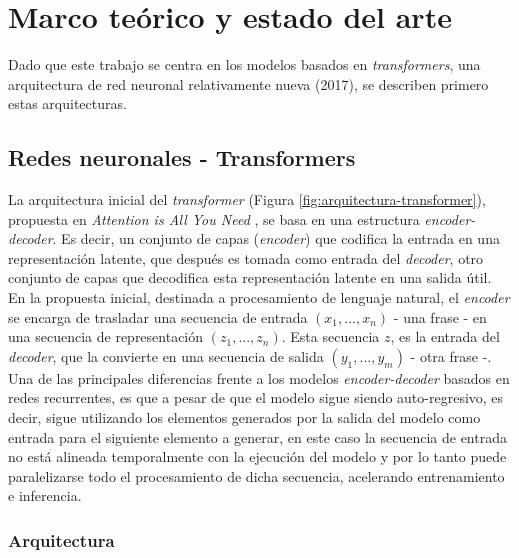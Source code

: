 \documentclass[a4paper, 11pt]{article}
\begin{document}
\section{Marco teórico y estado del arte}\label{marco_teorico_estado_arte}

Dado que este trabajo se centra en los modelos basados en \textit{transformers}, una arquitectura de red neuronal relativamente nueva (2017), se describen primero estas arquitecturas.

\subsection{Redes neuronales - Transformers}
La arquitectura inicial del \textit{transformer} (Figura \ref{fig:arquitectura-transformer}), propuesta en \textit{Attention is All You Need} \cite{NIPS2017_3f5ee243}, se basa en una estructura \textit{encoder-decoder}. Es decir, un conjunto de capas (\textit{encoder}) que codifica la entrada en una representación latente, que después es tomada como entrada del \textit{decoder}, otro conjunto de capas que decodifica esta representación latente en una salida útil. En la propuesta inicial, destinada a procesamiento de lenguaje natural, el \textit{encoder} se encarga de trasladar una secuencia de entrada $(x_1, ..., x_n)$ - una frase - en una secuencia de representación $(z_1, ..., z_n)$. Esta secuencia $z$, es la entrada del \textit{decoder}, que la convierte en una secuencia de salida $(y_1, ..., y_m)$ - otra frase -. Una de las principales diferencias frente a los modelos \textit{encoder-decoder} basados en redes recurrentes, es que a pesar de que el modelo sigue siendo auto-regresivo, es decir, sigue utilizando los elementos generados por la salida del modelo como entrada para el siguiente elemento a generar, en este caso la secuencia de entrada no está alineada temporalmente con la ejecución del modelo y por lo tanto puede paralelizarse todo el procesamiento de dicha secuencia, acelerando entrenamiento e inferencia.

\clearpage
\subsubsection{Arquitectura}
\end{document}
